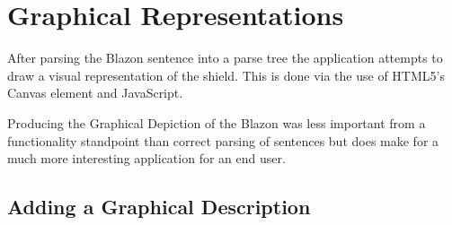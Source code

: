 \chapter{Graphical Representations} 

After parsing the Blazon sentence into a parse tree the application attempts to draw a visual representation of the shield.  This is done via the use of HTML5's Canvas element and JavaScript.  

Producing the Graphical Depiction of the Blazon was less important from a  functionality standpoint than correct parsing of sentences but does make for a much more interesting application for an end user.  



\section{Adding a Graphical Description}



